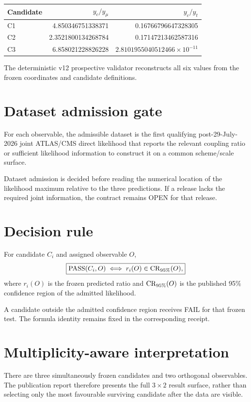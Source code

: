 \begin{center}
\begin{tabular}{lrr}
\toprule
Candidate & \(y_c/y_\mu\) & \(y_c/y_t\)\\
\midrule
C1 & 4.850346751338371 & 0.16766796647328305\\
C2 & 2.3521800134268784 & 0.17147213462587316\\
C3 & 6.858021228826228 & \(2.8101955040512466\times10^{-11}\)\\
\bottomrule
\end{tabular}
\end{center}

The deterministic v12 prospective validator reconstructs all six values from
the frozen coordinates and candidate definitions.

\section{Dataset admission gate}

For each observable, the admissible dataset is the first qualifying
post-29-July-2026 joint ATLAS/CMS direct likelihood that reports the relevant
coupling ratio or sufficient likelihood information to construct it on a common
scheme/scale surface.

Dataset admission is decided before reading the numerical location of the
likelihood maximum relative to the three predictions.  If a release lacks the
required joint information, the contract remains OPEN for that release.

\section{Decision rule}

For candidate \(C_i\) and assigned observable \(O\),
\[
\boxed{
\operatorname{PASS}(C_i,O)
\iff
r_i(O)\in{\rm CR}_{95\%}(O),
}
\]
where \(r_i(O)\) is the frozen predicted ratio and
\({\rm CR}_{95\%}(O)\) is the published 95\% confidence region of the admitted
likelihood.

A candidate outside the admitted confidence region receives FAIL for that
frozen test.  The formula identity remains fixed in the corresponding receipt.

\section{Multiplicity-aware interpretation}

There are three simultaneously frozen candidates and two orthogonal observables.
The publication report therefore presents the full \(3\times2\) result surface,
rather than selecting only the most favourable surviving candidate after the
data are visible.

